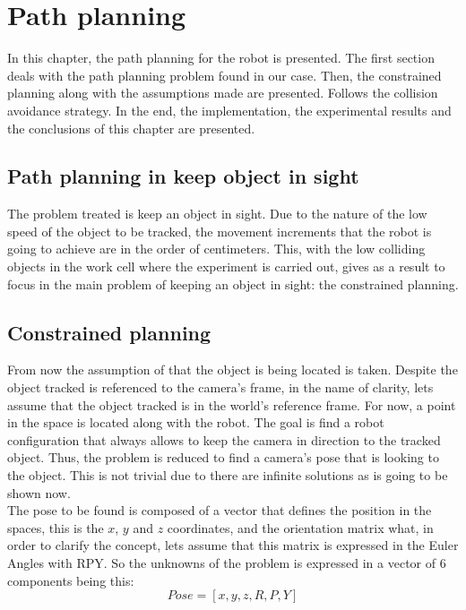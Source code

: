 \chapter{Path planning} %
\label{chap:path_planning}

In this chapter, the path planning for the robot is presented.
The first section deals with the path planning problem found in our case. Then, the constrained planning along with the assumptions made are presented. Follows the collision avoidance strategy. In the end, the implementation, the experimental results and the conclusions of this chapter are presented.

\section{Path planning in keep object in sight} %
\label{sec:path_planning_in_keep_object_in_sight}
The problem treated is keep an object in sight. 
Due to the nature of the low speed of the object to be tracked, the movement increments that the robot is going to achieve are in the order of centimeters. 
This, with the low colliding objects in the work cell where the experiment is carried out, gives as a result to focus in the main problem of keeping an object in sight: the constrained planning.

\section{Constrained planning} %
\label{sec:constrained_planning}
From now the assumption of that the object is being located is taken. 
Despite the object tracked is referenced to the camera's frame, in the name of clarity, lets assume that the object tracked is in the world's reference frame. 
For now, a point in the space is located along with the robot.
The goal is find a robot configuration that always allows to keep the camera in direction to the tracked object.
Thus, the problem is reduced to find a camera's pose that is looking to the object.
This is not trivial due to there are infinite solutions as is going to be shown now. \\

The pose to be found is composed of a vector that defines the position in the spaces, this is the $x$, $y$ and $z$ coordinates, and the orientation matrix what, in order to clarify the concept, lets assume that this matrix is expressed in the Euler Angles with RPY. So the unknowns of the problem is expressed in a vector of 6 components being this:
	\begin{equation}
	\label{eq:pose_cartesian_coordinates}
		Pose = [x,y,z,R,P,Y]
	\end{equation}

